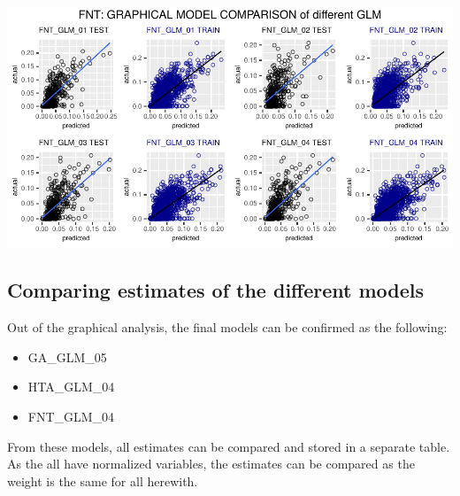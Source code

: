 \documentclass[
]{article}
\providecommand{\tightlist}{%
  \setlength{\itemsep}{0pt}\setlength{\parskip}{0pt}}
\begin{document}
\includegraphics{Influence_factors_files/figure-latex/2.30_FNT_model_eval_graphically-1.pdf}

\hypertarget{comparing-estimates-of-the-different-models}{%
\subsection{Comparing estimates of the different
models}\label{comparing-estimates-of-the-different-models}}

Out of the graphical analysis, the final models can be confirmed as the
following:

\begin{itemize}
\tightlist
\item
  GA\_GLM\_05
\item
  HTA\_GLM\_04
\item
  FNT\_GLM\_04
\end{itemize}

From these models, all estimates can be compared and stored in a
separate table. As the all have normalized variables, the estimates can
be compared as the weight is the same for all herewith.
\end{document}

